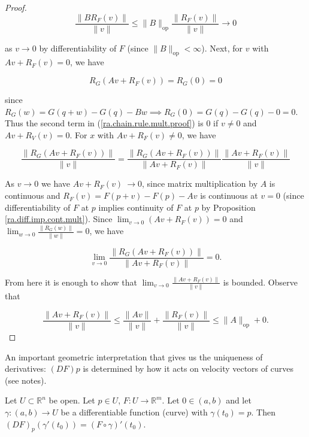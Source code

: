 \begin{proof}
\[
\frac{\lVert B R_F(v) \rVert}{\lVert v \rVert}  \leq \lVert B \rVert_{\text{op}} \frac{ \lVert R_F(v) \rVert}{\lVert v \rVert} \to 0
\]

as \(v \to 0\) by differentiability of \(F\) (since \(\lVert B \rVert_{\text{op}} < \infty\)). Next, for \(v\) with \(Av+ R_F(v) = 0\), we have

\[
R_G(Av + R_F(v)) = R_G(0) = 0
\]

since \(R_G(w) = G(q + w) - G(q) - Bw \implies R_G(0) = G(q) - G(q) - 0 = 0\). Thus the second term in (\ref{ra.chain.rule.mult.proof}) is 0 if \(v \neq 0\) and \(Av + R_V(v) = 0\). For \(x\) with \(Av + R_F(v) \neq 0\), we have

\[
 \frac{ \lVert R_G(Av + R_F(v)) \rVert}{\lVert v \rVert} =  \frac{ \lVert R_G(Av + R_F(v)) \rVert}{ \lVert Av + R_F(v) \rVert}  \frac{ \lVert Av + R_F(v) \rVert}{\lVert v \rVert}
\]

As \(v \to 0\) we have \(Av + R_F(v) \ \to 0\), since matrix multiplication by \(A\) is continuous and \(R_F(v) = F(p+v) - F(p) - Av\) is continuous at \(v=0\) (since differentiability of \(F\) at \(p\) implies continuity of \(F\) at \(p\) by Proposition \ref{ra.diff.imp.cont.mult}). Since \(\lim_{v \to 0} (Av + R_F(v) ) = 0\) and \(\lim_{w \to 0} \frac{ \lVert R_G(w) \rVert}{\lVert w \rVert} = 0\), we have 

\[
\lim_{v \to 0}  \frac{ \lVert R_G(Av + R_F(v)) \rVert}{ \lVert Av + R_F(v) \rVert} = 0.
\]

From here it is enough to show that \(\lim_{v \to 0}  \frac{ \lVert Av + R_F(v) \rVert}{\lVert v \rVert} \) is bounded. Observe that

\[
 \frac{ \lVert Av + R_F(v) \rVert}{\lVert v \rVert} \leq \frac{ \lVert Av \rVert}{\lVert v \rVert} + \frac{ \lVert R_F(v) \rVert}{\lVert v \rVert} \leq \lVert A \rVert_{\text{op}} + 0.
\]

\end{proof}

An important geometric interpretation that gives us the uniqueness of derivatives: \((DF)p\) is determined by how it acts on velocity vectors of curves (see notes).

\begin{corollary}

Let \(U \subset \mathbb{R}^n\) be open. Let \(p \in U\), \(F: U \to \mathbb{R}^m\). Let \(0 \in (a,b)\) and let \(\gamma: (a,b) \to U\) be a differentiable function (curve) with \(\gamma(t_0) = p\). Then \((DF)_p(\gamma'(t_0)) = (F \circ \gamma)'(t_0)\).

\end{corollary}

